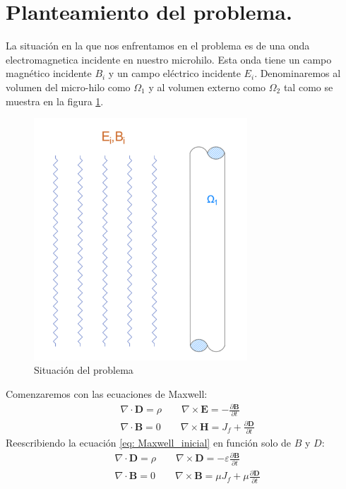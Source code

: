 \documentclass[11pt]{article}
\begin{document}
\section{Planteamiento del problema.}\label{sec:Planteamiento del problema.}
\setcounter{figure}{0}
\setcounter{equation}{0}
La situación en la que nos enfrentamos en el problema es de una onda electromagnetica incidente en nuestro microhilo. Esta onda tiene un campo magnético incidente $B_i$ y un campo eléctrico incidente $E_i$. Denominaremos al volumen del micro-hilo como $\Omega_1$ y al volumen externo como $\Omega_2$ tal como se muestra en la figura \ref{fig:Representacion del problema}.
\begin{figure}[H]
\centering
\includegraphics[width=8cm]{Imagenes/ondaincidente.png}
\caption{Situación del problema} \label{fig:Representacion del problema}
\end{figure}
Comenzaremos con las ecuaciones de Maxwell:
\begin{equation}
\begin{split}
&\nabla\cdot\textbf{D} = \rho\qquad\nabla\times\textbf{E} = -\frac{\partial\textbf{B}}{\partial t}\\
&\nabla\cdot\textbf{B} = 0\qquad\nabla\times\textbf{H} = J_f+\frac{\partial\textbf{D}}{\partial t}
\end{split}
\label{eq: Maxwell_inicial}
\end{equation}
Reescribiendo la ecuación \eqref{eq: Maxwell_inicial} en función solo de $B$ y $D$:
\begin{equation}
\begin{split}
&\nabla\cdot\textbf{D} = \rho\qquad \nabla\times\textbf{D} = -\varepsilon\frac{\partial\textbf{B}}{\partial t}\\
&\nabla\cdot\textbf{B} = 0\qquad\nabla\times\textbf{B} = \mu J_f+\mu\frac{\partial\textbf{D}}{\partial t}
\end{split}
\label{eq: Maxwell_soloBD}
\end{equation}
\end{document}
